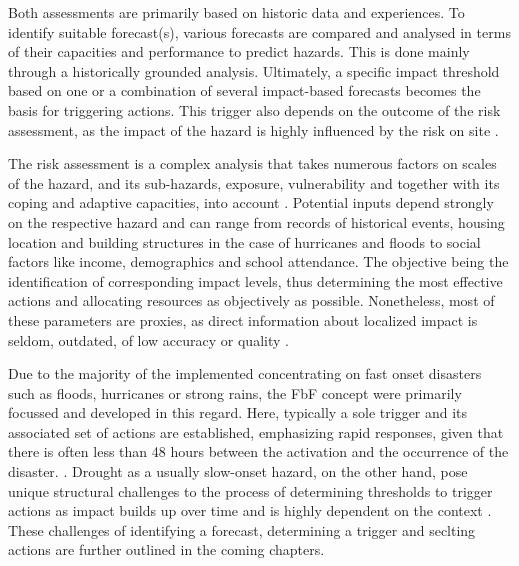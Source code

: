 
Both assessments are primarily based on historic data and experiences. To identify suitable forecast(s), various forecasts are compared and analysed in terms of their capacities and performance to predict hazards. This is done mainly through a historically grounded analysis. Ultimately, a specific impact threshold based on one or a combination of several impact-based forecasts becomes the basis for triggering actions. This trigger also depends on the outcome of the risk assessment, as the impact of the hazard is highly influenced by the risk on site \autocite{ifrcFbFPractitionersManual2023,ifrcForecastbasedFinancingNew2019}.

The risk assessment is a complex analysis that takes numerous factors on scales of the hazard, and its sub-hazards, exposure, vulnerability and together with its coping and adaptive capacities, into account \autocite{ifrcFbFPractitionersManual2023}. Potential inputs depend strongly on the respective hazard and can range from records of historical events, housing location and building structures in the case of hurricanes and floods to social factors like income, demographics and school attendance. The objective being the identification of corresponding impact levels, thus determining the most effective actions and allocating resources as objectively as possible. Nonetheless, most of these parameters are proxies, as direct information about localized impact is seldom, outdated, of low accuracy or quality \autocite{ifrcFbFPractitionersManual2023}.

Due to the majority of the implemented  concentrating on fast onset disasters such as floods, hurricanes or strong rains, the FbF concept were primarily focussed and developed in this regard. Here, typically a sole trigger and its associated set of actions are established, emphasizing rapid responses, given that there is often less than 48 hours between the activation and the occurrence of the disaster. \autocite{rcrcFORECASTBASEDFINANCINGEARLY2020}. Drought as a usually slow-onset hazard, on the other hand, pose unique structural challenges to the process of determining thresholds to trigger actions as impact builds up over time and is highly dependent on the context \autocite{boultDroughtImpactbasedForecasting2022}. These challenges of identifying a forecast, determining a trigger and seclting actions are further outlined in the coming chapters.

